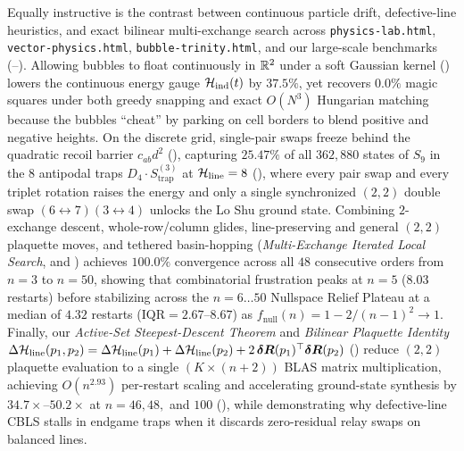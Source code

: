 Equally instructive is the contrast between continuous particle drift, defective-line heuristics, and exact bilinear multi-exchange search across \texttt{physics-lab.html}, \texttt{vector-physics.html}, \texttt{bubble-trinity.html}, and our large-scale benchmarks (--). Allowing bubbles to float continuously in $\mathbb{R}^2$ under a soft Gaussian kernel () lowers the continuous energy gauge $\mathcal{H}_{\mathrm{ind}}(t)$ by $37.5\%$, yet recovers $0.0\%$ magic squares under both greedy snapping and exact $O(N^3)$ Hungarian matching \cite{kuhn1955hungarian,munkres1957algorithms} because the bubbles ``cheat'' by parking on cell borders to blend positive and negative heights. On the discrete grid, single-pair swaps freeze behind the quadratic recoil barrier $c_{ab}d^2$ (), capturing $25.47\%$ of all $362{,}880$ states of $S_9$ in the $8$ antipodal traps $D_4 \cdot S_{\mathrm{trap}}^{(3)}$ at $\mathcal{H}_{\mathrm{line}} = 8$ (), where every pair swap and every triplet rotation raises the energy and only a single synchronized $(2,2)$ double swap $(6\leftrightarrow 7)(3\leftrightarrow 4)$ unlocks the Lo Shu ground state. Combining $2$-exchange descent, whole-row/column glides, line-preserving and general $(2,2)$ plaquette moves, and tethered basin-hopping (\emph{Multi-Exchange Iterated Local Search},  and ) achieves $100.0\%$ convergence across all $48$ consecutive orders from $n = 3$ to $n = 50$, showing that combinatorial frustration peaks at $n = 5$ ($8.03$ restarts) before stabilizing across the $n = 6\dots 50$ Nullspace Relief Plateau at a median of $4.32$ restarts ($\text{IQR} = 2.67\text{--}8.67$) as $f_{\mathrm{null}}(n) = 1 - 2/(n-1)^2 \to 1$. Finally, our \emph{Active-Set Steepest-Descent Theorem} and \emph{Bilinear Plaquette Identity} $\Delta\mathcal{H}_{\mathrm{line}}(p_1, p_2) = \Delta\mathcal{H}_{\mathrm{line}}(p_1) + \Delta\mathcal{H}_{\mathrm{line}}(p_2) + 2\,\boldsymbol{\delta R}(p_1)^\top \boldsymbol{\delta R}(p_2)$ () reduce $(2,2)$ plaquette evaluation to a single $(K \times (n+2))$ BLAS matrix multiplication, achieving $O(n^{2.93})$ per-restart scaling and accelerating ground-state synthesis by $34.7\times\text{--}50.2\times$ at $n = 46, 48,$ and $100$ (), while demonstrating why defective-line CBLS stalls in endgame traps when it discards zero-residual relay swaps on balanced lines.

